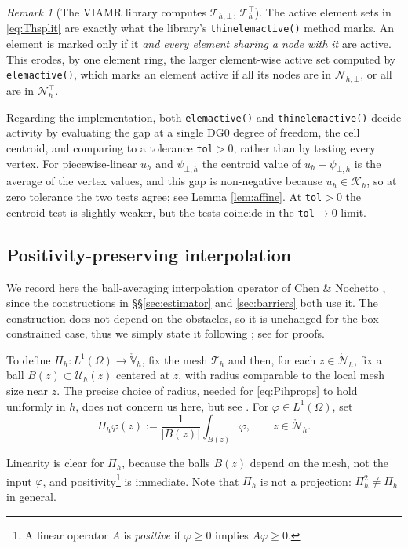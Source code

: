 \documentclass[12pt]{amsart}
\numberwithin{equation}{section}
\theoremstyle{plain}
\theoremstyle{definition}
\theoremstyle{remark}
\newtheorem{remark}[theorem]{Remark}
\newcommand{\Om}{\Omega}
\newcommand{\psiloh}{\psi_{\bot,h}}
\newcommand{\Th}{\mathcal{T}_h}
\newcommand{\Vhr}{\mathring{\mathbb{V}}_h}
\newcommand{\Nh}{\mathcal{N}_h}
\newcommand{\Nhr}{\mathring{\mathcal{N}}_h}
\newcommand{\Pih}{\Pi_h}
\newcommand{\Uh}{\mathcal{U}_h}
\newcommand{\Kh}{\mathcal{K}_h}
\newcommand{\Thbot}{\mathcal{T}_{h,\bot}}
\newcommand{\Thtop}{\Th^\top}
\newcommand{\Nhbot}{\mathcal{N}_{h,\bot}}
\newcommand{\Nhtop}{\Nh^\top}
\begin{document}
\begin{remark}[The VIAMR library computes $\Thbot$, $\Thtop$]
\label{rem:thinactive}
The active element sets in \eqref{eq:Thsplit} are exactly what the library's \texttt{thinelemactive()} method marks.  An element is marked only if it \emph{and every element sharing a node with it} are active.  This erodes, by one element ring, the larger element-wise active set computed by \texttt{elemactive()}, which marks an element active if all its nodes are in $\Nhbot$, or all are in $\Nhtop$.

Regarding the implementation, both \texttt{elemactive()} and \texttt{thinelemactive()} decide activity by evaluating the gap at a single DG0 degree of freedom, the cell centroid, and comparing to a tolerance \texttt{tol}$>0$, rather than by testing every vertex.  For piecewise-linear $u_h$ and $\psiloh$ the centroid value of $u_h - \psiloh$ is the average of the vertex values, and this gap is non-negative because $u_h \in \Kh$, so at zero tolerance the two tests agree; see Lemma \ref{lem:affine}.  At \texttt{tol}$>0$ the centroid test is slightly weaker, but the tests coincide in the \texttt{tol}$\to 0$ limit.
\end{remark}

\subsection{Positivity-preserving interpolation}  We record here the ball-averaging interpolation operator of Chen \& Nochetto \cite{ChenNochetto2000}, since the constructions in \S\S \ref{sec:estimator} and \ref{sec:barriers} both use it.  The construction does not depend on the obstacles, so it is unchanged for the box-constrained case, thus we simply state it following \cite[\S 2.2]{NSV03}; see \cite{ChenNochetto2000} for proofs.

To define $\Pih : L^1(\Om) \to \Vhr$, fix the mesh $\Th$ and then, for each $z \in \Nhr$, fix a ball $B(z) \subset \Uh(z)$ centered at $z$, with radius comparable to the local mesh size near $z$.  The precise choice of radius, needed for \eqref{eq:Pihprops} to hold uniformly in $h$, does not concern us here, but see \cite[\S 6]{NSV03}.  For $\varphi \in L^1(\Om)$, set
\begin{equation}
\label{eq:Pih}
  \Pih\varphi(z) := \frac{1}{|B(z)|}\int_{B(z)}\varphi, \qquad z \in \Nhr.
\end{equation}

Linearity is clear for $\Pih$, because the balls $B(z)$ depend on the mesh, not the input $\varphi$, and positivity\footnote{A linear operator $A$ is \emph{positive} if $\varphi \ge 0$ implies $A\varphi \ge 0$.} is immediate.  Note that $\Pih$ is not a projection: $\Pih^2 \ne \Pih$ in general.
\end{document}
